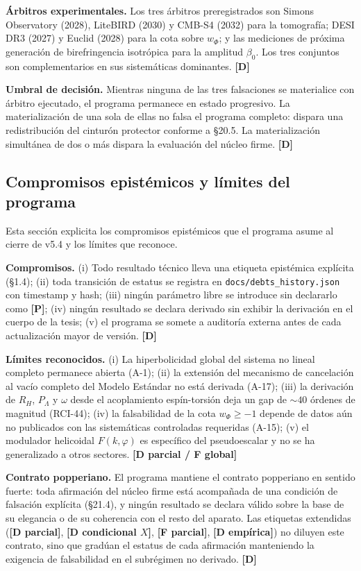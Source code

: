 ﻿\documentclass[11pt,letterpaper]{article}
\begin{document}
\textbf{Árbitros experimentales.} Los tres árbitros preregistrados son Simons Observatory (2028), LiteBIRD (2030) y CMB-S4 (2032) para la tomografía; DESI DR3 (2027) y Euclid (2028) para la cota sobre $w_\Phi$; y las mediciones de próxima generación de birefringencia isotrópica para la amplitud $\beta_0$. Los tres conjuntos son complementarios en sus sistemáticas dominantes. \textbf{[D]}

\textbf{Umbral de decisión.} Mientras ninguna de las tres falsaciones se materialice con árbitro ejecutado, el programa permanece en estado progresivo. La materialización de una sola de ellas no falsa el programa completo: dispara una redistribución del cinturón protector conforme a §20.5. La materialización simultánea de dos o más dispara la evaluación del núcleo firme. \textbf{[D]}
\subsection{Compromisos epistémicos y límites del programa}
Esta sección explicita los compromisos epistémicos que el programa asume al cierre de v5.4 y los límites que reconoce.

\textbf{Compromisos.} (i) Todo resultado técnico lleva una etiqueta epistémica explícita (§1.4); (ii) toda transición de estatus se registra en \texttt{docs/debts\_history.json} con timestamp y hash; (iii) ningún parámetro libre se introduce sin declararlo como \textbf{[P]}; (iv) ningún resultado se declara derivado sin exhibir la derivación en el cuerpo de la tesis; (v) el programa se somete a auditoría externa antes de cada actualización mayor de versión. \textbf{[D]}

\textbf{Límites reconocidos.} (i) La hiperbolicidad global del sistema no lineal completo permanece abierta (A-1); (ii) la extensión del mecanismo de cancelación al vacío completo del Modelo Estándar no está derivada (A-17); (iii) la derivación de $R_H$, $P_\Lambda$ y $\omega$ desde el acoplamiento espín-torsión deja un gap de $\sim 40$ órdenes de magnitud (RCI-44); (iv) la falsabilidad de la cota $w_\Phi \geq -1$ depende de datos aún no publicados con las sistemáticas controladas requeridas (A-15); (v) el modulador helicoidal $F(k, \varphi)$ es específico del pseudoescalar y no se ha generalizado a otros sectores. \textbf{[D parcial / F global]}

\textbf{Contrato popperiano.} El programa mantiene el contrato popperiano en sentido fuerte: toda afirmación del núcleo firme está acompañada de una condición de falsación explícita (§21.4), y ningún resultado se declara válido sobre la base de su elegancia o de su coherencia con el resto del aparato. Las etiquetas extendidas (\textbf{[D parcial]}, \textbf{[D condicional $X$]}, \textbf{[F parcial]}, \textbf{[D empírica]}) no diluyen este contrato, sino que gradúan el estatus de cada afirmación manteniendo la exigencia de falsabilidad en el subrégimen no derivado. \textbf{[D]}
\end{document}
